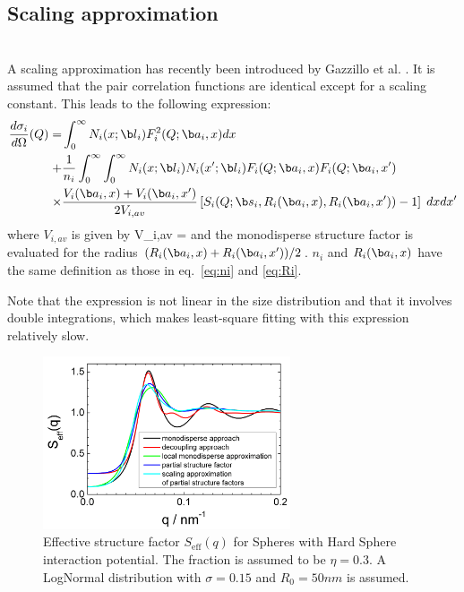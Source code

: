 \subsection{Scaling approximation}
\label{sec:SQscaling}
~\\

A scaling approximation has recently been introduced by Gazzillo
et al. \cite{Gazzillo1999}. It is assumed that the pair correlation functions
are identical except for a scaling constant. This leads to the
following expression:
\begin{align}
\frac{d\sigma_i}{d\Omega}(Q) =
 &\int_0^\infty N_i(x;\B{l}_i) F_i^2(Q;\B{a}_i,x) dx \\
+ & \frac{1}{n_i}\int_0^\infty\int_0^\infty
N_i(x;\B{l}_i) N_i(x';\B{l}_i) F_i(Q;\B{a}_i,x) F_i(Q;\B{a}_i,x') \nonumber \\
\times & \frac{V_i(\B{a}_i,x)+V_i(\B{a}_i,x')}{2V_{i,av}}
\left[S_i(Q;\B{s}_i,R_i(\B{a}_i,x),R_i(\B{a}_i,x'))-1\right]
\;dx dx' \nonumber
\end{align}
where $V_{i,av}$ is given by
\BE
V_{i,av} = 
\EE
and the monodisperse structure factor is evaluated for the radius
$(R_i(\B{a}_i,x)+R_i(\B{a}_i,x'))/2$. $n_i$ and $R_i(\B{a}_i,x)$ have the same
definition as those in eq.\ \ref{eq:ni} and \ref{eq:Ri}.

Note that the expression is not linear in the size distribution
and that it involves double integrations, which makes least-square
fitting with this expression relatively slow.

\begin{figure}[htb]
\begin{center}
\includegraphics[width=0.65\textwidth,height=0.5\textwidth]{../images/structure_factor/Seff.png}
\end{center}
\caption{Effective structure factor $S_\text{eff}(q)$ for Spheres with Hard Sphere interaction potential.
The fraction is assumed to be $\eta=0.3$. A LogNormal distribution with $\sigma=0.15$ and $R_0=50nm$
is assumed.}
\label{fig:Seff}
\end{figure}

